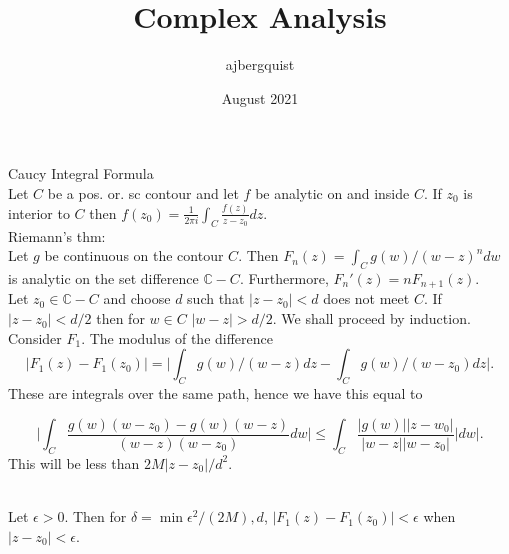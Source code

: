 \documentclass{article}
\title{Complex Analysis}
\author{ajbergquist }
\date{August 2021}
\theoremstyle{definition}
\newcommand{\C}{\mathbb{C}}
\begin{document}
 Caucy Integral Formula\\

Let $C$ be a pos. or. sc contour and let $f$ be analytic on and inside $C$. If $z_0$ is interior to $C$ then $f(z_0) = \frac{1}{2\pi i}\int_C\frac{f(z)}{z-z_0}dz$. \\

 Riemann's thm:\\

Let $g$ be continuous on the contour $C$. Then $F_n(z) = \int_Cg(w)/(w-z)^ndw$ is analytic on the set difference $\C-C$. Furthermore, $F_n'(z) = nF_{n+1}(z)$. \\

 Let $z_0 \in \C-C$ and choose $d$ such that $|z-z_0|<d$ does not meet $C$. If $|z-z_0| < d/2$ then for $w\in C$ $|w-z|> d/2$. We shall proceed by induction.\\

Consider $F_1$. The modulus of the difference $$|F_1(z) - F_1(z_0)| = \Big|\int_Cg(w)/(w-z)dz - \int_Cg(w)/(w-z_0)dz\Big|.$$
These are integrals over the same path, hence we have this equal to

$$\Big|\int_C\frac{g(w)(w-z_0)-g(w)(w-z)}{(w-z)(w-z_0)}dw\Big|\le \int_C\frac{|g(w)||z-w_0|}{|w-z||w-z_0|}|dw|.$$ This will be less than $2M|z-z_0|/d^2$. 

\\Let $\epsilon > 0$. Then for $\delta = \min{ \epsilon^2/(2M), d}$, $|F_1(z) - F_1(z_0)| < \epsilon$ when $|z-z_0| < \epsilon$. 
\end{document}
